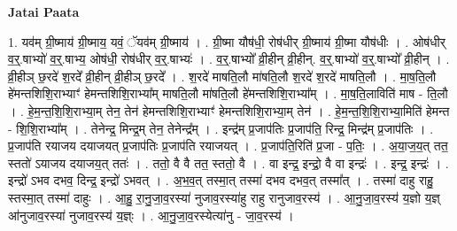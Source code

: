 \documentclass[17pt]{extarticle}
\begin{document}
\textbf{Jatai Paata} \newline

1. यव॑म् ग्री॒ष्माय॑ ग्री॒ष्माय॒ यवं॒ ॅयव॑म् ग्री॒ष्माय॑ । . ग्री॒ष्मा यौष॑धी॒ रोष॑धीर् ग्री॒ष्माय॑ ग्री॒ष्मा यौष॑धीः । . ओष॑धीर् व॒र्॒.षाभ्यो॑ व॒र्॒.षाभ्य॒ ओष॑धी॒ रोष॑धीर् व॒र्॒.षाभ्यः॑ । . व॒र्॒.षाभ्यो᳚ व्री॒हीन् व्री॒हीन्. व॒र्॒.षाभ्यो॑ व॒र्॒.षाभ्यो᳚ व्री॒हीन् । . व्री॒हीञ् छ॒रदे॑ श॒रदे᳚ व्री॒हीन् व्री॒हीञ् छ॒रदे᳚ । . श॒रदे॑ माषति॒लौ मा॑षति॒लौ श॒रदे॑ श॒रदे॑ माषति॒लौ । . मा॒ष॒ति॒लौ हे॑मन्तशिशि॒राभ्याꣳ॑ हेमन्तशिशि॒राभ्या᳚म् माषति॒लौ मा॑षति॒लौ हे॑मन्तशिशि॒राभ्या᳚म् । . मा॒ष॒ति॒लाविति॑ माष - ति॒लौ । . हे॒म॒न्त॒शि॒शि॒राभ्या॒म् तेन॒ तेन॑ हेमन्तशिशि॒राभ्याꣳ॑ हेमन्तशिशि॒राभ्या॒म् तेन॑ । . हे॒म॒न्त॒शि॒शि॒राभ्या॒मिति॑ हेमन्त - शि॒शि॒राभ्या᳚म् । . तेनेन्द्र॒ मिन्द्र॒म् तेन॒ तेनेन्द्र᳚म् । . इन्द्र॑म् प्र॒जाप॑तिः प्र॒जाप॑ति॒ रिन्द्र॒ मिन्द्र॑म् प्र॒जाप॑तिः । . प्र॒जाप॑ति रयाजय दयाजयत् प्र॒जाप॑तिः प्र॒जाप॑ति रयाजयत् । . प्र॒जाप॑ति॒रिति॑ प्र॒जा - प॒तिः॒ । . अ॒या॒ज॒य॒त् तत॒ स्ततो॑ ऽयाजय दयाजय॒त् ततः॑ । . ततो॒ वै वै तत॒ स्ततो॒ वै । . वा इन्द्र॒ इन्द्रो॒ वै वा इन्द्रः॑ । . इन्द्र॒ इन्द्रः॑ । . इन्द्रो॑ ऽभव दभव॒ दिन्द्र॒ इन्द्रो॑ ऽभवत् । . अ॒भ॒व॒त् तस्मा॒त् तस्मा॑ दभव दभव॒त् तस्मा᳚त् । . तस्मा॑ दाहु राहु॒ स्तस्मा॒त् तस्मा॑ दाहुः । . आ॒हु॒ रा॒नु॒जा॒व॒रस्या॑ नुजाव॒रस्या॑हु राहु रानुजाव॒रस्य॑ । . आ॒नु॒जा॒व॒रस्य॑ य॒ज्ञो य॒ज्ञ् आ॑नुजाव॒रस्या॑ नुजाव॒रस्य॑ य॒ज्ञ्ः । . आ॒नु॒जा॒व॒रस्येत्या॑नु - जा॒व॒रस्य॑ । \newline
\end{document}
